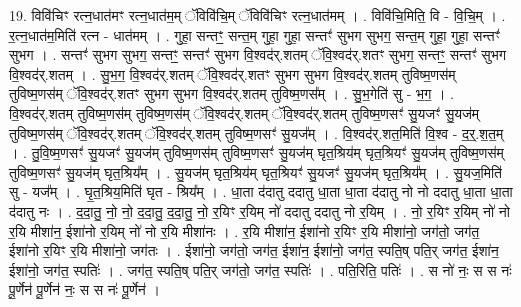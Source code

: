 \documentclass[17pt]{extarticle}
\begin{document}
19. विवि॑चिꣳ रत्न॒धात॑मꣳ रत्न॒धात॑म॒म् ॅविवि॑चि॒म् ॅविवि॑चिꣳ रत्न॒धात॑मम् । . विवि॑चि॒मिति॒ वि - वि॒चि॒म् । . र॒त्न॒धात॑म॒मिति॑ रत्न - धात॑मम् । . गुहा॒ सन्तꣳ॒॒ सन्त॒म् गुहा॒ गुहा॒ सन्तꣳ॑ सुभग सुभग॒ सन्त॒म् गुहा॒ गुहा॒ सन्तꣳ॑ सुभग । . सन्तꣳ॑ सुभग सुभग॒ सन्तꣳ॒॒ सन्तꣳ॑ सुभग वि॒श्वद॑र्.शतम् ॅवि॒श्वद॑र्.शतꣳ सुभग॒ सन्तꣳ॒॒ सन्तꣳ॑ सुभग वि॒श्वद॑र्.शतम् । . सु॒भ॒ग॒ वि॒श्वद॑र्.शतम् ॅवि॒श्वद॑र्.शतꣳ सुभग सुभग वि॒श्वद॑र्.शतम् तुविष्म॒णस॑म् तुविष्म॒णस॑म् ॅवि॒श्वद॑र्.शतꣳ सुभग सुभग वि॒श्वद॑र्.शतम् तुविष्म॒णस᳚म् । . सु॒भ॒गेति॑ सु - भ॒ग॒ । . वि॒श्वद॑र्.शतम् तुविष्म॒णस॑म् तुविष्म॒णस॑म् ॅवि॒श्वद॑र्.शतम् ॅवि॒श्वद॑र्.शतम् तुविष्म॒णसꣳ॑ सु॒यजꣳ॑ सु॒यज॑म् तुविष्म॒णस॑म् ॅवि॒श्वद॑र्.शतम् ॅवि॒श्वद॑र्.शतम् तुविष्म॒णसꣳ॑ सु॒यज᳚म् । . वि॒श्वद॑र्.शत॒मिति॑ वि॒श्व - द॒र्॒.श॒त॒म् । . तु॒वि॒ष्म॒णसꣳ॑ सु॒यजꣳ॑ सु॒यज॑म् तुविष्म॒णस॑म् तुविष्म॒णसꣳ॑ सु॒यज॑म् घृत॒श्रिय॑म् घृत॒श्रियꣳ॑ सु॒यज॑म् तुविष्म॒णस॑म् तुविष्म॒णसꣳ॑ सु॒यज॑म् घृत॒श्रिय᳚म् । . सु॒यज॑म् घृत॒श्रिय॑म् घृत॒श्रियꣳ॑ सु॒यजꣳ॑ सु॒यज॑म् घृत॒श्रिय᳚म् । . सु॒यज॒मिति॑ सु - यज᳚म् । . घृ॒त॒श्रिय॒मिति॑ घृत - श्रिय᳚म् । . धा॒ता द॑दातु ददातु धा॒ता धा॒ता द॑दातु नो नो ददातु धा॒ता धा॒ता द॑दातु नः । . द॒दा॒तु॒ नो॒ नो॒ द॒दा॒तु॒ द॒दा॒तु॒ नो॒ र॒यिꣳ र॒यिम् नो॑ ददातु ददातु नो र॒यिम् । . नो॒ र॒यिꣳ र॒यिम् नो॑ नो र॒यि मीशा॑न॒ ईशा॑नो र॒यिम् नो॑ नो र॒यि मीशा॑नः । . र॒यि मीशा॑न॒ ईशा॑नो र॒यिꣳ र॒यि मीशा॑नो॒ जग॑तो॒ जग॑त॒ ईशा॑नो र॒यिꣳ र॒यि मीशा॑नो॒ जग॑तः । . ईशा॑नो॒ जग॑तो॒ जग॑त॒ ईशा॑न॒ ईशा॑नो॒ जग॑त॒ स्पति॒ष् पति॒र् जग॑त॒ ईशा॑न॒ ईशा॑नो॒ जग॑त॒ स्पतिः॑ । . जग॑त॒ स्पति॒ष् पति॒र् जग॑तो॒ जग॑त॒ स्पतिः॑ । . पति॒रिति॒ पतिः॑ । . स नो॑ नः॒ स स नः॑ पू॒र्णेन॑ पू॒र्णेन॑ नः॒ स स नः॑ पू॒र्णेन॑ । \newline
\end{document}
